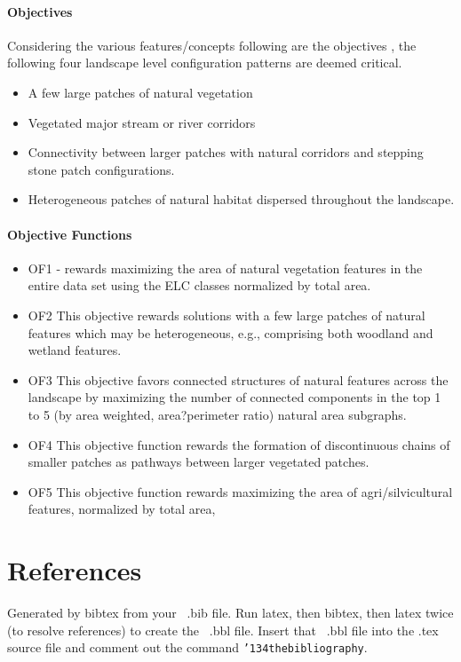 \documentclass{sig-alternate}
\begin{document}
\paragraph*{Objectives}
Considering the various features/concepts following are the objectives ,  the following four landscape level configuration patterns are deemed critical.

\begin{itemize}
  \item A few large patches of natural vegetation
 \item  Vegetated major stream or river corridors
 \item   Connectivity between larger patches with natural corridors and stepping stone patch configurations.
 \item  Heterogeneous patches of natural habitat dispersed throughout the landscape.
\end{itemize}
\paragraph*{Objective Functions}
\begin{itemize}
  \item OF1 - rewards maximizing the area of natural vegetation features in the entire data
set using the ELC classes normalized by total area.
 \item OF2 This objective rewards solutions with a few large patches of natural features which may be heterogeneous, e.g., comprising both woodland and wetland features.
 \item OF3 This objective favors connected structures of natural features across the landscape by maximizing the number of connected components in the top 1 to 5 (by area weighted, area?perimeter ratio) natural area subgraphs.
 \item OF4 This objective function rewards the formation of
discontinuous chains of smaller patches as pathways between larger vegetated
patches.
 \item OF5 This objective function rewards maximizing the area of agri/silvicultural features, normalized by total area,

\end{itemize}





\section{References}
Generated by bibtex from your ~.bib file.  Run latex,
then bibtex, then latex twice (to resolve references)
to create the ~.bbl file.  Insert that ~.bbl file into
the .tex source file and comment out
the command \texttt{{\char'134}thebibliography}.
\end{document}
